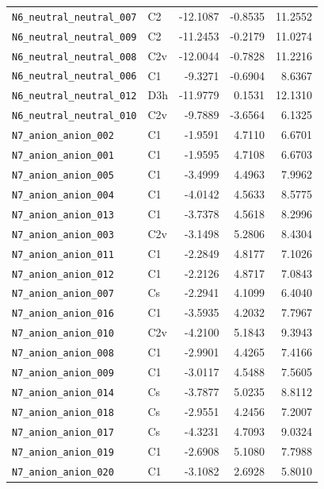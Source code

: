 {\begin{longtable}{@{}p{4.6cm}p{1.6cm}rrr@{}}
\texttt{N6\_neutral\_neutral\_007} & C2 & -12.1087 & -0.8535 & 11.2552 \\
\texttt{N6\_neutral\_neutral\_009} & C2 & -11.2453 & -0.2179 & 11.0274 \\
\texttt{N6\_neutral\_neutral\_008} & C2v & -12.0044 & -0.7828 & 11.2216 \\
\texttt{N6\_neutral\_neutral\_006} & C1 & -9.3271 & -0.6904 & 8.6367 \\
\texttt{N6\_neutral\_neutral\_012} & D3h & -11.9779 & 0.1531 & 12.1310 \\
\texttt{N6\_neutral\_neutral\_010} & C2v & -9.7889 & -3.6564 & 6.1325 \\
\addlinespace
\texttt{N7\_anion\_anion\_002} & C1 & -1.9591 & 4.7110 & 6.6701 \\
\texttt{N7\_anion\_anion\_001} & C1 & -1.9595 & 4.7108 & 6.6703 \\
\texttt{N7\_anion\_anion\_005} & C1 & -3.4999 & 4.4963 & 7.9962 \\
\texttt{N7\_anion\_anion\_004} & C1 & -4.0142 & 4.5633 & 8.5775 \\
\texttt{N7\_anion\_anion\_013} & C1 & -3.7378 & 4.5618 & 8.2996 \\
\texttt{N7\_anion\_anion\_003} & C2v & -3.1498 & 5.2806 & 8.4304 \\
\texttt{N7\_anion\_anion\_011} & C1 & -2.2849 & 4.8177 & 7.1026 \\
\texttt{N7\_anion\_anion\_012} & C1 & -2.2126 & 4.8717 & 7.0843 \\
\texttt{N7\_anion\_anion\_007} & Cs & -2.2941 & 4.1099 & 6.4040 \\
\texttt{N7\_anion\_anion\_016} & C1 & -3.5935 & 4.2032 & 7.7967 \\
\texttt{N7\_anion\_anion\_010} & C2v & -4.2100 & 5.1843 & 9.3943 \\
\texttt{N7\_anion\_anion\_008} & C1 & -2.9901 & 4.4265 & 7.4166 \\
\texttt{N7\_anion\_anion\_009} & C1 & -3.0117 & 4.5488 & 7.5605 \\
\texttt{N7\_anion\_anion\_014} & Cs & -3.7877 & 5.0235 & 8.8112 \\
\texttt{N7\_anion\_anion\_018} & Cs & -2.9551 & 4.2456 & 7.2007 \\
\texttt{N7\_anion\_anion\_017} & Cs & -4.3231 & 4.7093 & 9.0324 \\
\texttt{N7\_anion\_anion\_019} & C1 & -2.6908 & 5.1080 & 7.7988 \\
\texttt{N7\_anion\_anion\_020} & C1 & -3.1082 & 2.6928 & 5.8010 \\

\end{longtable}}
